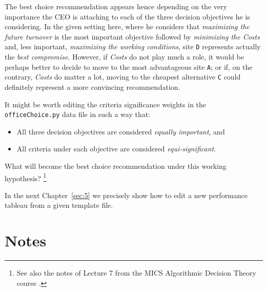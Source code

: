 The best choice recommendation appears hence depending on the very importance the CEO is attaching to each of the three decision objectives he is considering. In the given setting here, where he considers that \emph{maximizing the future turnover} is the most important objective followed by \emph{minimizing the Costs} and, less important, \emph{maximizing the working conditions}, site \texttt{D} represents actually the \emph{best compromise}. However, if \emph{Costs} do not play much a role, it would be perhaps better to decide to move to the most advantageous site \texttt{A}; or if, on the contrary, \emph{Costs} do matter a lot, moving to the cheapest alternative \texttt{C} could definitely represent a more convincing recommendation. 

It might be worth editing the criteria significance weights in the\\
\texttt{officeChoice.py} data file in such a way that:
\begin{itemize}
\item All three decision objectives are considered \emph{equally important}, and
\item All criteria under each objective are considered \emph{equi-significant}.
\end{itemize}
What will become the best choice recommendation under this working hypothesis? \footnote{See also the notes of Lecture 7 from the MICS Algorithmic Decision Theory course \citep{ADT-L7}.} 

In the next Chapter~\vref{sec:5} we precisely show how to edit a new performance tableau from a given template file. 

{}
\section*{Notes}

